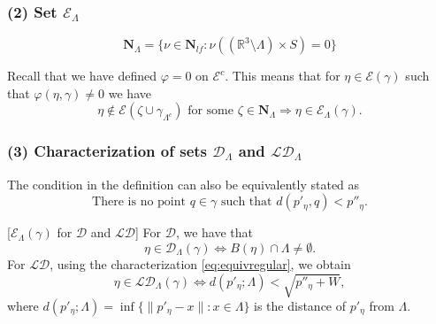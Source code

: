 \documentclass[c, 10pt]{beamer}
\begin{document}
\begin{frame}[noframenumbering]\frametitle{(2) Set $\mathcal E_\Lambda$}

$$\mathbf N_\Lambda = \{ \nu \in \mathbf N_{lf}: \nu( (\mathbb R^3 \setminus \Lambda) \times S) = 0 \}$$





Recall that we have defined $\varphi=0$ on $\mathcal E^c$. This means that for $\eta \in \mathcal E(\gamma)$ such that $\varphi(\eta,\gamma)\neq 0$ we have
$$\eta \notin \mathcal E(\zeta \cup \gamma_{\Lambda^c})\text{ for some }\zeta \in \mathbf N_{\Lambda} \Rightarrow \eta \in \mathcal E_{\Lambda}(\gamma).$$ 


\end{frame}



\begin{frame}[noframenumbering]\frametitle{(3) Characterization of sets $\mathcal D_\Lambda$ and $\mathcal {LD}_\Lambda$}


The condition in the definition can also be equivalently stated as 
\begin{equation*}\label{eq:equivregular}\text{There is no point } q\in\gamma \text{ such that } d(p'_\eta,q)<p''_\eta.\end{equation*}

[$\mathcal E_\Lambda(\gamma)$ for $\mathcal D$ and $\mathcal {LD}$] 
	For $\mathcal D$, we have that 
	$$\eta \in \mathcal D_\Lambda(\gamma)\iff B(\eta) \cap \Lambda \neq \emptyset.$$ 
	For $\mathcal {LD}$, using the characterization \eqref{eq:equivregular}, we obtain 
	$$\eta \in \mathcal {LD}_\Lambda(\gamma) \iff d(p'_\eta;\Lambda) < \sqrt{p''_\eta + W},$$
	where $d(p'_\eta;\Lambda) = \inf\{\|p'_\eta - x\|: x \in \Lambda\}$ is the distance of $p'_\eta$ from $\Lambda$.    


\end{frame}
\end{document}
